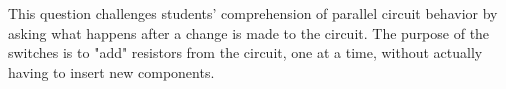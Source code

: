This question challenges students' comprehension of parallel circuit behavior by asking what happens after a change is made to the circuit.  The purpose of the switches is to "add" resistors from the circuit, one at a time, without actually having to insert new components.




